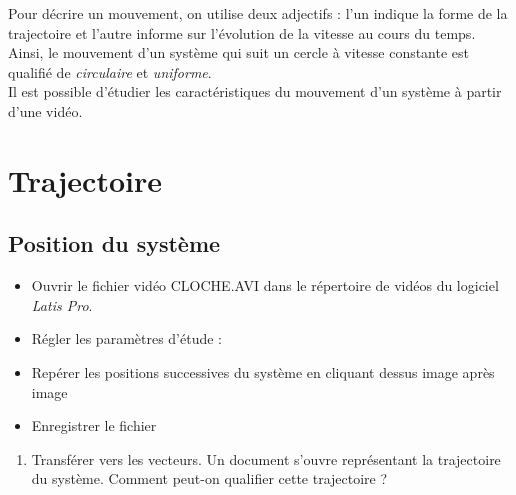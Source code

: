 \documentclass[a4paper,11pt,fleqn]{article}%
\begin{document}
\maketitle

Pour décrire un mouvement, on utilise deux adjectifs : l'un indique la forme de la trajectoire et l'autre informe sur l'évolution de la vitesse au cours du temps. Ainsi, le mouvement d'un système qui suit un cercle à vitesse constante est qualifié de \textit{circulaire} et \textit{uniforme}.\\ Il est possible d'étudier les caractéristiques du mouvement d'un système à partir d'une vidéo.
\section{Trajectoire}
	\subsection*{Position du système}
	\begin{itemize}
		\item Ouvrir le fichier vidéo CLOCHE.AVI dans le répertoire de vidéos du logiciel \textit{Latis Pro}.
		\item Régler les paramètres d'étude :
		\item Repérer les positions successives du système en cliquant dessus image après image
		\item Enregistrer le fichier
	\end{itemize}
	\begin{enumerate}
		\item Transférer vers les vecteurs. Un document s'ouvre représentant la trajectoire du système. Comment peut-on qualifier cette trajectoire ?
	\end{enumerate}
	\noindent {}
\end{document}
